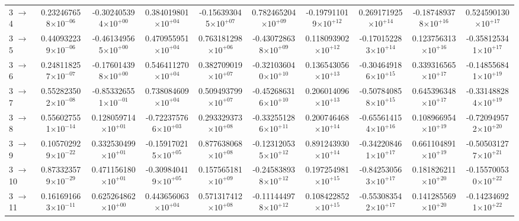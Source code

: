 \documentclass[reviewcopy]{elsarticle}
\begin{document}
\begin{landscape}
\begin{longtable}{lccccccccc}
3 $\to$ 4  & 0.232467658$\times10^{-06}$  & -0.302405394$\times10^{+00}$  & 0.384019801$\times10^{+04}$  & -0.156393045$\times10^{+07}$  & 0.782465204$\times10^{+09}$  & -0.197911019$\times10^{+12}$  & 0.269171925$\times10^{+14}$  & -0.187489378$\times10^{+16}$  & 0.524590130$\times10^{+17}$ \\
3 $\to$ 5  & 0.440932239$\times10^{-06}$  & -0.461349565$\times10^{+00}$  & 0.470955951$\times10^{+04}$  & 0.763181298$\times10^{+06}$  & -0.430728638$\times10^{+09}$  & 0.118093902$\times10^{+12}$  & -0.170152283$\times10^{+14}$  & 0.123756313$\times10^{+16}$  & -0.358125341$\times10^{+17}$ \\
3 $\to$ 6  & 0.248118257$\times10^{-07}$  & -0.176014398$\times10^{+00}$  & 0.546411270$\times10^{+04}$  & 0.382709019$\times10^{+07}$  & -0.321036040$\times10^{+10}$  & 0.136543056$\times10^{+13}$  & -0.304649186$\times10^{+15}$  & 0.339316565$\times10^{+17}$  & -0.148556841$\times10^{+19}$ \\
3 $\to$ 7  & 0.552823502$\times10^{-08}$  & -0.853326551$\times10^{-01}$  & 0.738084609$\times10^{+04}$  & 0.509493799$\times10^{+07}$  & -0.452686316$\times10^{+10}$  & 0.206014096$\times10^{+13}$  & -0.507840858$\times10^{+15}$  & 0.645396348$\times10^{+17}$  & -0.331488284$\times10^{+19}$ \\
3 $\to$ 8  & 0.556027551$\times10^{-14}$  & 0.128059714$\times10^{+01}$  & -0.722375766$\times10^{+03}$  & 0.293329373$\times10^{+08}$  & -0.332551286$\times10^{+11}$  & 0.200746468$\times10^{+14}$  & -0.655614154$\times10^{+16}$  & 0.108966954$\times10^{+19}$  & -0.720949572$\times10^{+20}$ \\
3 $\to$ 9  & 0.105702929$\times10^{-22}$  & 0.332530499$\times10^{+01}$  & -0.159170215$\times10^{+05}$  & 0.877638068$\times10^{+08}$  & -0.123120535$\times10^{+12}$  & 0.891243930$\times10^{+14}$  & -0.342208461$\times10^{+17}$  & 0.661104891$\times10^{+19}$  & -0.505031277$\times10^{+21}$ \\
3 $\to$ 10  & 0.873323579$\times10^{-29}$  & 0.471156180$\times10^{+01}$  & -0.309840419$\times10^{+05}$  & 0.157565181$\times10^{+09}$  & -0.245838938$\times10^{+12}$  & 0.197254981$\times10^{+15}$  & -0.842530563$\times10^{+17}$  & 0.181826211$\times10^{+20}$  & -0.155700530$\times10^{+22}$ \\
3 $\to$ 11  & 0.161691663$\times10^{-11}$  & 0.625264862$\times10^{+00}$  & 0.443656063$\times10^{+04}$  & 0.571317412$\times10^{+08}$  & -0.111444978$\times10^{+12}$  & 0.108422852$\times10^{+15}$  & -0.553083542$\times10^{+17}$  & 0.141285569$\times10^{+20}$  & -0.142346921$\times10^{+22}$ \\

\end{longtable}
\end{landscape}
\end{document}
